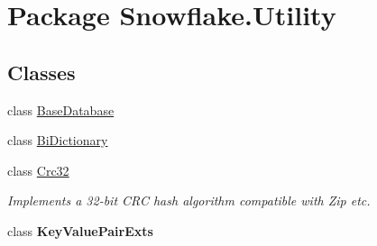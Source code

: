 \hypertarget{namespace_snowflake_1_1_utility}{}\section{Package Snowflake.\+Utility}
\label{namespace_snowflake_1_1_utility}
\subsection*{Classes}
\begin{DoxyCompactItemize}
\item 
class \hyperlink{class_snowflake_1_1_utility_1_1_base_database}{Base\+Database}
\item 
class \hyperlink{class_snowflake_1_1_utility_1_1_bi_dictionary}{Bi\+Dictionary}
\item 
class \hyperlink{class_snowflake_1_1_utility_1_1_crc32}{Crc32}
\begin{DoxyCompactList}\small\item\em Implements a 32-\/bit C\+R\+C hash algorithm compatible with Zip etc. \end{DoxyCompactList}\item 
class {\bfseries Key\+Value\+Pair\+Exts}
\end{DoxyCompactItemize}
